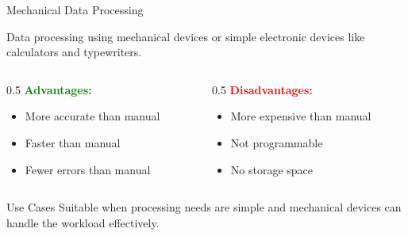 \documentclass[aspectratio=169]{beamer}
\begin{document}
\begin{frame}{Mechanical Data Processing}
    \begin{definition}
        Data processing using mechanical devices or simple electronic devices like calculators and typewriters.
    \end{definition}
    
    \vspace{0.5cm}
    \begin{columns}
        \begin{column}{0.5\textwidth}
            \textbf{\textcolor{green}{Advantages:}}
            \begin{itemize}
                \item[\faCheck] More accurate than manual
                \item[\faCheck] Faster than manual
                \item[\faCheck] Fewer errors than manual
            \end{itemize}
        \end{column}
        \begin{column}{0.5\textwidth}
            \textbf{\textcolor{red}{Disadvantages:}}
            \begin{itemize}
                \item[\faTimes] More expensive than manual
                \item[\faTimes] Not programmable
                \item[\faTimes] No storage space
            \end{itemize}
        \end{column}
    \end{columns}
    
    \vspace{0.5cm}
    \begin{exampleblock}{Use Cases}
        Suitable when processing needs are simple and mechanical devices can handle the workload effectively.
    \end{exampleblock}
    
\end{frame}
\end{document}
